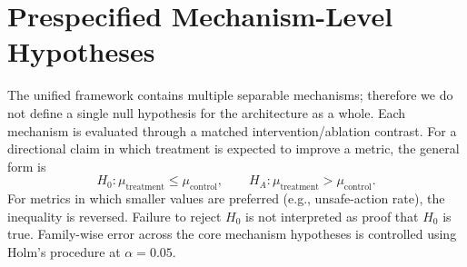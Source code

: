 \section{Prespecified Mechanism-Level Hypotheses}
The unified framework contains multiple separable mechanisms; therefore we do not define a single null hypothesis for the architecture as a whole. Each mechanism is evaluated through a matched intervention/ablation contrast. For a directional claim in which treatment is expected to improve a metric, the general form is
\[
H_0:\mu_{\mathrm{treatment}}\leq\mu_{\mathrm{control}},\qquad
H_A:\mu_{\mathrm{treatment}}>\mu_{\mathrm{control}}.
\]
For metrics in which smaller values are preferred (e.g., unsafe-action rate), the inequality is reversed. Failure to reject $H_0$ is not interpreted as proof that $H_0$ is true. Family-wise error across the core mechanism hypotheses is controlled using Holm's procedure at $\alpha=0.05$.

